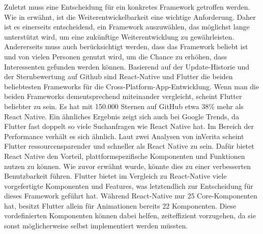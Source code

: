 \myNewSection
Zuletzt muss eine Entscheidung für ein konkretes Framework getroffen werden. %
	Wie in  erwähnt, ist die Weiterentwickelbarkeit eine wichtige Anforderung. Daher ist es einerseits entscheidend, ein Framework auszuwählen, das möglichst lange unterstützt wird, um eine zukünftige Weiterentwicklung zu gewährleisten.\newline%
	Andererseits muss auch berücksichtigt werden, dass das Framework beliebt ist und von vielen Personen genutzt wird, um die Chance zu erhöhen, dass Interessenten gefunden werden können.\newline%
	Basierend auf der Update-Historie und der Sternbewertung auf Github sind React-Native und Flutter die beiden beliebtesten Frameworks für die Cross-Platform-App-Entwicklung\cite{tech_flutterStars, tech_reactNativStars}.\newline%
Wenn man die beiden Frameworks dementsprechend miteinander vergleicht, scheint Flutter beliebter zu sein. Es hat mit 150.000 Sternen auf GitHub etwa 38\% mehr als React Native\cite{tech_flutterStars, tech_reactNativStars}. Ein ähnliches Ergebnis zeigt sich auch bei Google Trends, da Flutter fast doppelt so viele Suchanfragen wie React Native hat\cite{tech_googleTrendsFlutterVsReactNative}.\newline%
Im Bereich der Performance verhält es sich ähnlich. Laut zwei Analysen von inVerita scheint Flutter ressourcensparender und schneller als React Native zu sein\cite{tech_performanceReactNativeVsFlutter1, tech_performanceReactNativeVsFlutter2}.\newline%
Dafür bietet React Native den Vorteil, plattformspezifische Komponenten und Funktionen nutzen zu können. Wie zuvor erwähnt wurde, könnte dies zu einer verbesserten Benutzbarkeit führen.
\newline%
Flutter bietet im Vergleich zu React-Native viele vorgefertigte Komponenten und Features, was letztendlich zur Entscheidung für dieses Framework geführt hat. Während React-Native nur 25 Core-Komponenten hat, besitzt Flutter allein für Animationen bereits 22 Komponenten\cite{tech_componentsFlutter, tech_componentsReactNative}. Diese vordefinierten Komponenten können dabei helfen, zeiteffizient vorzugehen, da sie sonst möglicherweise selbst implementiert werden müssten.%
%
%
%
%